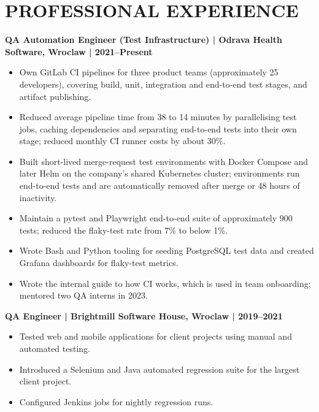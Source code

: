 \documentclass[11pt,a4paper]{article}
\begin{document}
\section*{PROFESSIONAL EXPERIENCE}
\textbf{QA Automation Engineer (Test Infrastructure) | Odrava Health Software, Wroclaw | 2021--Present}
\begin{itemize}
\item Own GitLab CI pipelines for three product teams (approximately 25 developers), covering build, unit, integration and end-to-end test stages, and artifact publishing.
\item Reduced average pipeline time from 38 to 14 minutes by parallelising test jobs, caching dependencies and separating end-to-end tests into their own stage; reduced monthly CI runner costs by about 30\%.
\item Built short-lived merge-request test environments with Docker Compose and later Helm on the company's shared Kubernetes cluster; environments run end-to-end tests and are automatically removed after merge or 48 hours of inactivity.
\item Maintain a pytest and Playwright end-to-end suite of approximately 900 tests; reduced the flaky-test rate from 7\% to below 1\%.
\item Wrote Bash and Python tooling for seeding PostgreSQL test data and created Grafana dashboards for flaky-test metrics.
\item Wrote the internal guide to how CI works, which is used in team onboarding; mentored two QA interns in 2023.
\end{itemize}
\textbf{QA Engineer | Brightmill Software House, Wroclaw | 2019--2021}
\begin{itemize}
\item Tested web and mobile applications for client projects using manual and automated testing.
\item Introduced a Selenium and Java automated regression suite for the largest client project.
\item Configured Jenkins jobs for nightly regression runs.
\end{itemize}
\end{document}
